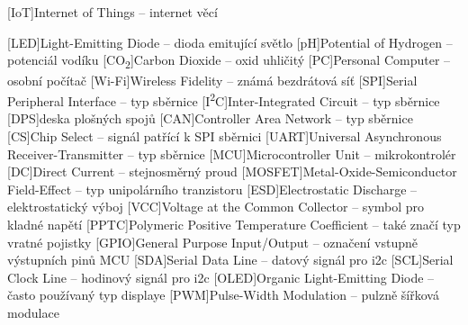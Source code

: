 \cleardoublepage
\chapter*{\listofabbrevname}
{}

\begin{acronym}[iotasdasdsd]

	[IoT]{Internet of Things -- internet věcí}

	[LED]{Light-Emitting Diode -- dioda emitující světlo}
	[pH]{Potential of Hydrogen -- potenciál vodíku}
	[CO\textsubscript{2}]{Carbon Dioxide -- oxid uhličitý}
	[PC]{Personal Computer -- osobní počítač}
	[Wi-Fi]{Wireless Fidelity -- známá bezdrátová síť}
	[SPI]{Serial Peripheral Interface -- typ sběrnice}
	[I\textsuperscript{2}C]{Inter-Integrated Circuit -- typ sběrnice}
	[DPS]{deska plošných spojů}
	[CAN]{Controller Area Network -- typ sběrnice}
	[CS]{Chip Select -- signál patřící k SPI sběrnici}
	[UART]{Universal Asynchronous Receiver-Transmitter -- typ sběrnice}
	[MCU]{Microcontroller Unit -- mikrokontrolér}
	[DC]{Direct Current -- stejnosměrný proud}
	[MOSFET]{Metal-Oxide-Semiconductor Field-Effect -- typ unipolárního tranzistoru}
	[ESD]{Electrostatic Discharge -- elektrostatický výboj}
	[VCC]{Voltage at the Common Collector -- symbol pro kladné napětí}
	[PPTC]{Polymeric Positive Temperature Coefficient -- také značí typ vratné pojistky}
	[GPIO]{General Purpose Input/Output -- označení vstupně výstupních pinů MCU}
	[SDA]{Serial Data Line -- datový signál pro \acs{i2c}}
	[SCL]{Serial Clock Line -- hodinový signál pro \acs{i2c}}
	[OLED]{Organic Light-Emitting Diode -- často používaný typ displaye}
	[PWM]{Pulse-Width Modulation -- pulzně šířková modulace}

\end{acronym}
